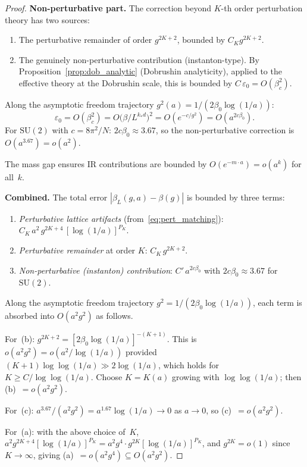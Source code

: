 \documentclass[11pt,a4paper]{article}
\theoremstyle{plain}
\theoremstyle{definition}
\theoremstyle{remark}
\newcommand{\SU}{\mathrm{SU}}
\begin{document}
\begin{proof}
\smallskip
\noindent\textbf{Non-perturbative part.}
The correction beyond $K$-th order perturbation theory
has two sources:
\begin{enumerate}[label=(\roman*),nosep]
  \item The perturbative remainder of order $g^{2K+2}$,
    bounded by $C_K g^{2K+2}$.
  \item The genuinely non-perturbative contribution
    (instanton-type).  By
    Proposition~\ref{prop:dob_analytic} (Dobrushin
    analyticity), applied to the effective theory at the
    Dobrushin scale, this is bounded by
    $C\,\varepsilon_0 = O(\beta_c^2)$.
\end{enumerate}
Along the asymptotic freedom trajectory
$g^2(a) = 1/(2\beta_0\log(1/a))$:
\begin{equation}
  \varepsilon_0 = O(\beta_c^2) = O\bigl(\beta/L^{k_* d}\bigr)^2
  = O(e^{-c/g^2}) = O(a^{2c\beta_0}).
\end{equation}
For $\SU(2)$ with $c = 8\pi^2/N$:
$2c\beta_0 \approx 3.67$, so the non-perturbative
correction is $O(a^{3.67}) = o(a^2)$.

The mass gap ensures IR contributions are bounded by
$O(e^{-m \cdot a}) = o(a^k)$ for all~$k$.

\smallskip
\noindent\textbf{Combined.}
The total error $|\beta_L(g,a) - \beta(g)|$ is bounded by
three terms:
\begin{enumerate}[label=(\alph*),nosep]
  \item \emph{Perturbative lattice artifacts}
    (from~\eqref{eq:pert_matching}):
    $C_K\,a^2\,g^{2K+4}\,[\log(1/a)]^{P_K}$.
  \item \emph{Perturbative remainder} at order $K$:
    $C_K\,g^{2K+2}$.
  \item \emph{Non-perturbative (instanton) contribution}:
    $C'\,a^{2c\beta_0}$ with $2c\beta_0 \approx 3.67$
    for $\SU(2)$.
\end{enumerate}
Along the asymptotic freedom trajectory
$g^2 = 1/(2\beta_0\log(1/a))$, each term is absorbed
into $O(a^2 g^2)$ as follows.

For~(b): $g^{2K+2} = [2\beta_0\log(1/a)]^{-(K+1)}$.
This is $o(a^2 g^2) = o(a^2/\log(1/a))$ provided
$(K+1)\log\log(1/a) \gg 2\log(1/a)$, which holds for
$K \geq C/\log\log(1/a)$.  Choose $K = K(a)$ growing
with $\log\log(1/a)$; then (b)~$= o(a^2 g^2)$.

For~(c): $a^{3.67} / (a^2 g^2) = a^{1.67}\log(1/a) \to 0$
as $a \to 0$, so (c)~$= o(a^2 g^2)$.

For~(a): with the above choice of~$K$,
$a^2 g^{2K+4}[\log(1/a)]^{P_K}
= a^2 g^4 \cdot g^{2K}[\log(1/a)]^{P_K}$,
and $g^{2K} = o(1)$ since $K \to \infty$, giving
(a)~$= o(a^2 g^4) \subseteq O(a^2 g^2)$.


\end{proof}
\end{document}
